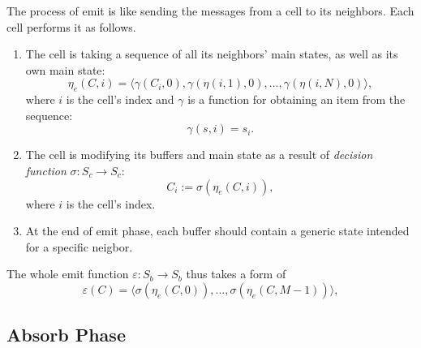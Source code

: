 \documentclass[a4paper,12pt,tikz,UTF8]{article}
\begin{document}
    The process of emit is like sending the messages from a cell to its neighbors. Each cell performs it as follows.
    \begin{enumerate}
      \item 
        The cell is taking a sequence of all its neighbors' main states, as well as its own main state:
        \begin{equation}
          \label{eq:neighbors-main-sequence}
          \eta_e(C, i) = \langle \gamma({C_i}, 0), \gamma(\eta(i, 1), 0), ..., \gamma(\eta(i, N), 0) \rangle,
        \end{equation}
        where $i$ is the cell's index and $\gamma$ is a function for obtaining an item from the sequence:
        \begin{equation}
          \label{eq:item-obtaining}
          \gamma(s, i) = s_i.
        \end{equation}
      \item
        The cell is modifying its buffers and main state as a result of \textit{decision function} $\sigma: S_c \to S_c$:
        \begin{equation}
          C_i := \sigma(\eta_e(C, i)),
        \end{equation}
        where $i$ is the cell's index.
      \item
        At the end of emit phase, each buffer should contain a generic state intended for a specific neigbor. 
    \end{enumerate}

    The whole emit function $\varepsilon: S_b \to S_b$ thus takes a form of
    \begin{equation}
      \varepsilon(C) = \langle \sigma(\eta_e(C, 0)), ..., \sigma(\eta_e(C, M - 1)) \rangle,
    \end{equation}

  \subsection{Absorb Phase}
\end{document}
